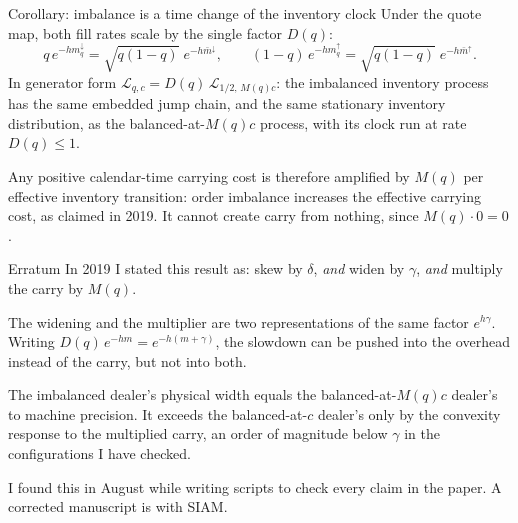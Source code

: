 \documentclass[10pt]{beamer}
\newcommand{\blue}[1]{\textcolor{pcblue}{#1}}
\begin{document}
\begin{frame}{Corollary: imbalance is a time change of the inventory clock}
Under the quote map, both fill rates scale by the single factor $D(q)$:
\[
q\,e^{-h m^{\downarrow}_q} = \sqrt{q(1-q)}\; e^{-h \bar m^{\downarrow}}, \qquad
(1-q)\,e^{-h m^{\uparrow}_q} = \sqrt{q(1-q)}\; e^{-h \bar m^{\uparrow}} .
\]
In generator form $\mathcal L_{q,c} = D(q)\,\mathcal L_{1/2,\,M(q)c}$: the imbalanced inventory process has the \blue{same embedded jump chain}, and the same stationary inventory distribution, as the balanced-at-$M(q)c$ process, with its clock run at rate $D(q) \le 1$.
\vspace{1em}

Any positive calendar-time carrying cost is therefore amplified by $M(q)$ per effective inventory transition: \blue{order imbalance increases the effective carrying cost}, as claimed in 2019. It cannot create carry from nothing, since $M(q)\cdot 0 = 0$.
\end{frame}

\begin{frame}{Erratum}
In 2019 I stated this result as: skew by $\delta$, \emph{and} widen by $\gamma$, \emph{and} multiply the carry by $M(q)$.
\vspace{1em}

The widening and the multiplier are two representations of the same factor $e^{h\gamma}$. Writing $D(q)\,e^{-hm} = e^{-h(m+\gamma)}$, the slowdown can be pushed into the overhead instead of the carry, but not into both.
\vspace{1em}

The imbalanced dealer's physical width equals the balanced-at-$M(q)c$ dealer's to machine precision. It exceeds the balanced-at-$c$ dealer's only by the convexity response to the multiplied carry, an order of magnitude below $\gamma$ in the configurations I have checked.
\vspace{1em}

I found this in August while writing scripts to check every claim in the paper. A corrected manuscript is with SIAM.
\end{frame}
\end{document}
